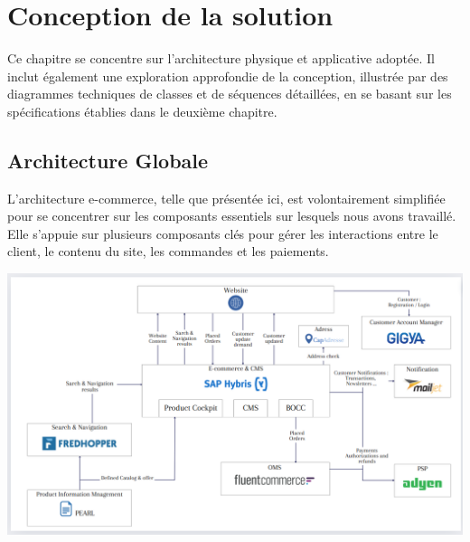 \chapter{Conception de la solution}
\label{Conception de la solution}

Ce chapitre se concentre sur l'architecture physique et applicative adoptée. Il inclut également une exploration approfondie de la conception, illustrée par des diagrammes techniques de classes et de séquences détaillées, en se basant sur les spécifications établies dans le deuxième chapitre.
\newpage


\section{Architecture Globale}

L'architecture e-commerce, telle que présentée ici, est volontairement simplifiée pour se concentrer sur les composants essentiels sur lesquels nous avons travaillé. Elle s’appuie sur plusieurs composants clés pour gérer les interactions entre le client, le contenu du site, les commandes et les paiements.
\begin{center}
    \centering
    \includegraphics[width=19cm]{Figures/architectureGlobale.png}
    \label{fig:processus}
\end{center}
